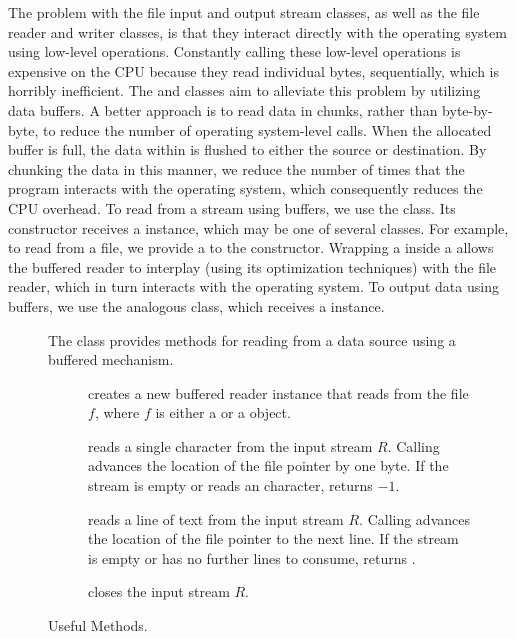The problem with the file input and output stream classes, as well as the file reader and writer classes, is that they interact directly with the operating system using low-level operations. 
Constantly calling these low-level operations is expensive on the CPU because they read individual bytes, sequentially, which is horribly inefficient. 
The  and  classes aim to alleviate this problem by utilizing data buffers. 
A better approach is to read data in chunks, rather than byte-by-byte, to reduce the number of operating system-level calls.
When the allocated buffer is full, the data within is flushed to either the source or destination. 
By chunking the data in this manner, we reduce the number of times that the program interacts with the operating system, which consequently reduces the CPU overhead.
To read from a stream using buffers, we use the  class. Its constructor receives a  instance, which may be one of several classes. 
For example, to read from a file, we provide a  to the  constructor. 
Wrapping a  inside a  allows the buffered reader to interplay (using its optimization techniques) with the file reader, which in turn interacts with the operating system. 
To output data using buffers, we use the analogous  class, which receives a  instance. 

\begin{figure}[tp]
  \small
  \begin{tcolorbox}[title=BufferedReader Methods]
    The  class provides methods for reading from a data source using a buffered mechanism.
    \vspace{2ex}
  \begin{description}
    \item [] creates a new buffered reader instance that reads from the file $f$, where $f$ is either a  or a  object.
    \item [] reads a single character from the input stream $R$. Calling  advances the location of the file pointer by one byte. If the stream is empty or reads an  character, returns $-1$.
    \item [] reads a line of text from the input stream $R$. Calling  advances the location of the file pointer to the next line. If the stream is empty or has no further lines to consume, returns .
    \item [] closes the input stream $R$.
  \end{description}
\end{tcolorbox}
  \caption{Useful  Methods.}
  \label{fig:br}
\end{figure}

